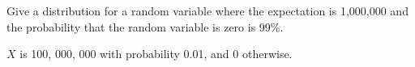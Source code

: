 \question Give a distribution for a random variable where the 
expectation is 1,000,000 and the probability that the random variable 
is zero is 99\%.
\begin{solution}[3cm]
$X$ is 100, 000, 000 with probability 0.01, and 0 otherwise. 
\end{solution}